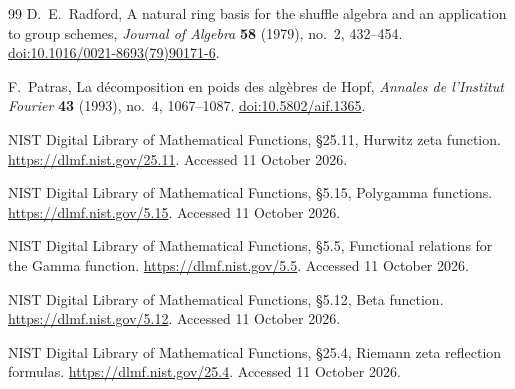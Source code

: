 \documentclass[11pt,a4paper]{article}
\numberwithin{equation}{section}
\theoremstyle{definition}
\theoremstyle{remark}
\begin{document}
\begin{thebibliography}{99}
D.~E.~Radford,
A natural ring basis for the shuffle algebra and an application to group
schemes, \emph{Journal of Algebra} \textbf{58} (1979), no.~2, 432--454.
\href{https://doi.org/10.1016/0021-8693(79)90171-6}{doi:10.1016/0021-8693(79)90171-6}.

F.~Patras,
La d\'ecomposition en poids des alg\`ebres de Hopf,
\emph{Annales de l'Institut Fourier} \textbf{43} (1993), no.~4, 1067--1087.
\href{https://doi.org/10.5802/aif.1365}{doi:10.5802/aif.1365}.




NIST Digital Library of Mathematical Functions,
\S25.11, Hurwitz zeta function.
\url{https://dlmf.nist.gov/25.11}. Accessed 11 October 2026.

NIST Digital Library of Mathematical Functions,
\S5.15, Polygamma functions.
\url{https://dlmf.nist.gov/5.15}. Accessed 11 October 2026.

NIST Digital Library of Mathematical Functions,
\S5.5, Functional relations for the Gamma function.
\url{https://dlmf.nist.gov/5.5}. Accessed 11 October 2026.

NIST Digital Library of Mathematical Functions,
\S5.12, Beta function.
\url{https://dlmf.nist.gov/5.12}. Accessed 11 October 2026.

NIST Digital Library of Mathematical Functions,
\S25.4, Riemann zeta reflection formulas.
\url{https://dlmf.nist.gov/25.4}. Accessed 11 October 2026.
\end{thebibliography}

\end{document}

